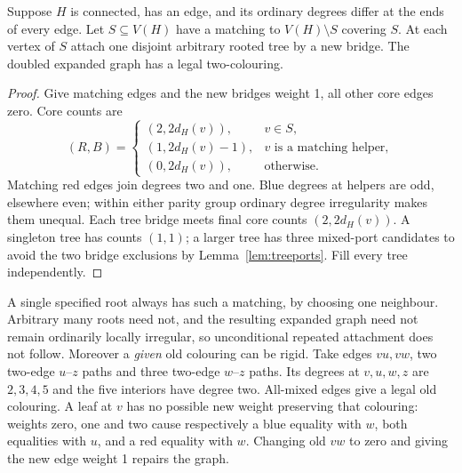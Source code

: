 \begin{proposition}\label{prop:irregularcore}
Suppose $H$ is connected, has an edge, and its ordinary degrees
differ at the ends of every edge. Let $S\subseteq V(H)$ have a
matching to $V(H)\setminus S$ covering $S$. At each vertex of $S$
attach one disjoint arbitrary rooted tree by a new bridge. The
doubled expanded graph has a legal two-colouring.
\end{proposition}
\begin{proof}
Give matching edges and the new bridges weight 1, all other core
edges zero. Core counts are
\[
 (R,B)=\begin{cases}
 (2,2d_H(v)),&v\in S,\\
 (1,2d_H(v)-1),&v\text{ is a matching helper},\\
 (0,2d_H(v)),&\text{otherwise}.
 \end{cases}
\]
Matching red edges join degrees two and one. Blue degrees at helpers
are odd, elsewhere even; within either parity group ordinary degree
irregularity makes them unequal. Each tree bridge meets final core
counts $(2,2d_H(v))$. A singleton tree has counts $(1,1)$; a larger
tree has three mixed-port candidates to avoid the two bridge
exclusions by Lemma~\ref{lem:treeports}. Fill every tree independently.
\end{proof}

A single specified root always has such a matching, by choosing
one neighbour. Arbitrary many roots need not, and the resulting
expanded graph need not remain ordinarily locally irregular, so
unconditional repeated attachment does not follow. Moreover a
\emph{given} old colouring can be rigid. Take edges $vu,vw$, two
two-edge $u$--$z$ paths and three two-edge $w$--$z$ paths. Its
degrees at $v,u,w,z$ are $2,3,4,5$ and the five interiors have degree
two. All-mixed edges give a legal old colouring. A leaf at $v$
has no possible new weight preserving that colouring: weights zero,
one and two cause respectively a blue equality with $w$, both
equalities with $u$, and a red equality with $w$. Changing old
$vw$ to zero and giving the new edge weight 1 repairs the graph.
